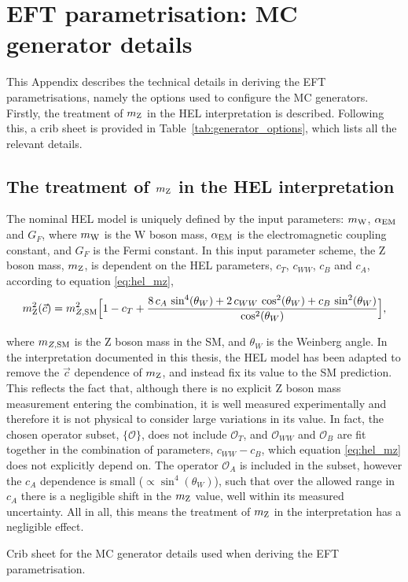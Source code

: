 \chapter{EFT parametrisation: MC generator details}\label{app:generator_options}
\vspace{-.5cm}
This Appendix describes the technical details in deriving the EFT parametrisations, namely the options used to configure the MC generators. Firstly, the treatment of $m_{\rm{Z}}$ in the HEL interpretation is described. Following this, a crib sheet is provided in Table~\ref{tab:generator_options}, which lists all the relevant details.
\vspace{-.3cm}
\section{The treatment of $m_{\rm{Z}}$ in the HEL interpretation}
The nominal HEL model is uniquely defined by the input parameters: $m_{\rm{W}}$, $\alpha_{\rm{EM}}$ and $G_F$, where $m_{\rm{W}}$ is the W boson mass, $\alpha_{\rm{EM}}$ is the electromagnetic coupling constant, and $G_F$ is the Fermi constant. In this input parameter scheme, the Z boson mass, $m_{\rm{Z}}$, is dependent on the HEL parameters, $c_T$, $c_{WW}$, $c_B$ and $c_A$, according to equation \ref{eq:hel_mz},
\begin{equation}\label{eq:hel_mz}
    m_{\rm{Z}}^2(\vec{c}) = m_{Z,\rm{SM}}^2 \Big[ 1-c_T+\frac{8\,c_A\,\sin^4(\theta_W)+2\,c_{WW}\,\cos^2(\theta_W)+c_B\,\sin^2(\theta_W)}{\cos^2(\theta_W)} \Big],
\end{equation}

\noindent
where $m_{Z,\rm{SM}}$ is the Z boson mass in the SM, and $\theta_W$ is the Weinberg angle. In the interpretation documented in this thesis, the HEL model has been adapted to remove the $\vec{c}$ dependence of $m_{\rm{Z}}$, and instead fix its value to the SM prediction. This reflects the fact that, although there is no explicit Z boson mass measurement entering the combination, it is well measured experimentally and therefore it is not physical to consider large variations in its value. In fact, the chosen operator subset, $\{\mathcal{O}\}$, does not include $\mathcal{O}_T$, and $\mathcal{O}_{WW}$ and $\mathcal{O}_B$ are fit together in the combination of parameters, $c_{WW}-c_B$, which equation \ref{eq:hel_mz} does not explicitly depend on. The operator $\mathcal{O}_A$ is included in the subset, however the $c_A$ dependence is small ($\propto \sin^4(\theta_W)$), such that over the allowed range in $c_A$ there is a negligible shift in the $m_{\rm{Z}}$ value, well within its measured uncertainty. All in all, this means the treatment of $m_{\rm{Z}}$ in the interpretation has a negligible effect.

\begin{table}[htb!]
  \centering
  \footnotesize
  \renewcommand{\arraystretch}{1.5}
  \setlength{\tabcolsep}{6pt}
  \caption[MC generator details for deriving the EFT parametrisation]
  {
    Crib sheet for the MC generator details used when deriving the EFT parametrisation.
  }
  \label{tab:generator_options}
  
\end{table}